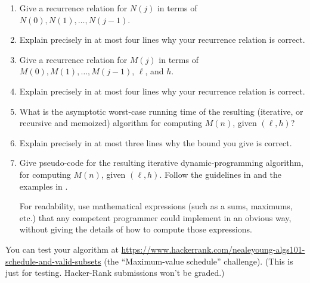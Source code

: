 \documentclass[11pt]{article}
\begin{document}
\begin{enumerate}[label=(\alph*)]
\item

Give a recurrence relation for $N(j)$ in terms of $N(0), N(1), \ldots, N(j-1)$.

\item
  
Explain precisely in at most four lines why your recurrence relation is correct. 

\item

Give a recurrence relation for $M(j)$ in terms of $M(0), M(1), \ldots, M(j-1)$, $\ell$, and $h$.

\item
  
Explain precisely in at most four lines why your recurrence relation is correct. 
 
\item

  What is the asymptotic worst-case running time of the resulting (iterative, or recursive and memoized) algorithm for computing $M(n)$, given $(\ell, h)$?

\item
  
  Explain precisely in at most three lines why the bound you give is correct. 

\item

Give pseudo-code for the resulting iterative dynamic-programming algorithm, for computing $M(n)$, given $(\ell, h)$.
Follow the guidelines in  and the examples in .

For readability, use mathematical expressions (such as a sums, maximums, etc.)
that any competent programmer could implement in an obvious way,
without giving the details of how to compute those expressions.

\end{enumerate}

You can test your algorithm at \url{https://www.hackerrank.com/nealeyoung-algs101-schedule-and-valid-subsets}
(the ``Maximum-value schedule'' challenge).
(This is just for testing. Hacker-Rank submissions won't be graded.)

\continued

\setlength{\ITEMHT}{1.9in}
{\injectEnumerate
}

\newpage
\end{document}
